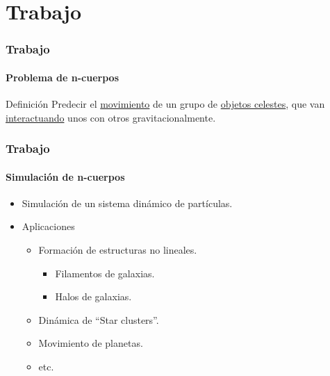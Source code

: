\section{Trabajo}

\frame
{
\frametitle{Trabajo}
\framesubtitle{Problema de n-cuerpos}
\begin{block}{Definición}
	Predecir el \underline{movimiento} de un grupo de \underline{objetos celestes},
	que van \underline{interactuando} unos con otros gravitacionalmente.
\end{block}
}

\frame
{
\frametitle{Trabajo}
\framesubtitle{Simulación de n-cuerpos}
\begin{itemize}
	\item Simulación de un sistema dinámico de partículas.
	\item Aplicaciones
	\begin{itemize}
		\item Formación de estructuras no lineales.
		\begin{itemize}
			\item Filamentos de galaxias.
			\item Halos de galaxias.
		\end{itemize}
		\item Dinámica de ``Star clusters''.
		\item Movimiento de planetas.
		\item etc.
	\end{itemize}
\end{itemize}
}

